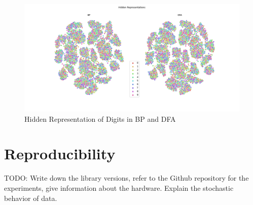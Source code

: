 \documentclass[a4paper, nobind]{templates/ociamthesis}
\newcommand*{\bibtitle}{References}
\begin{document}
\begin{figure}

{\centering \includegraphics[width=1\linewidth]{figures/B_tsne_BPDFA} 

}

\caption{Hidden Representation of Digits in BP and DFA}\label{fig:tSNEBPDFA}
\end{figure}

\hypertarget{reproducibility}{%
\chapter{Reproducibility}\label{reproducibility}}

TODO: Write down the library versions, refer to the Github repository for the experiments, give information about the hardware. Explain the stochastic behavior of data.


\setlength{\baselineskip}{0pt} %

{\renewcommand*\MakeUppercase[1]{#1}%
\printbibliography[heading=bibintoc,title={\bibtitle}]}
\end{document}
